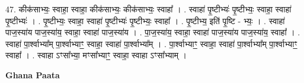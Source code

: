 \documentclass[17pt]{extarticle}
\begin{document}
47. कीक॑साभ्यः॒ स्वाहा॒ स्वाहा॒ कीक॑साभ्यः॒ कीक॑साभ्यः॒ स्वाहा᳚ । . स्वाहा॑ पृ॒ष्टीभ्यः॑ पृ॒ष्टीभ्यः॒ स्वाहा॒ स्वाहा॑ पृ॒ष्टीभ्यः॑ । . पृ॒ष्टीभ्यः॒ स्वाहा॒ स्वाहा॑ पृ॒ष्टीभ्यः॑ पृ॒ष्टीभ्यः॒ स्वाहा᳚ । . पृ॒ष्टीभ्य॒ इति॑ पृ॒ष्टि - भ्यः॒ । . स्वाहा॑ पाज॒स्या॑य पाज॒स्या॑य॒ स्वाहा॒ स्वाहा॑ पाज॒स्या॑य । . पा॒ज॒स्या॑य॒ स्वाहा॒ स्वाहा॑ पाज॒स्या॑य पाज॒स्या॑य॒ स्वाहा᳚ । . स्वाहा॑ पा॒र्श्वाभ्या᳚म् पा॒र्श्वाभ्याꣳ॒॒ स्वाहा॒ स्वाहा॑ पा॒र्श्वाभ्या᳚म् । . पा॒र्श्वाभ्याꣳ॒॒ स्वाहा॒ स्वाहा॑ पा॒र्श्वाभ्या᳚म् पा॒र्श्वाभ्याꣳ॒॒ स्वाहा᳚ । . स्वाहा ऽꣳसा᳚भ्या॒ मꣳसा᳚भ्याꣳ॒॒ स्वाहा॒ स्वाहा ऽꣳसा᳚भ्याम् । \newline

\textbf{Ghana Paata } \newline
\end{document}

